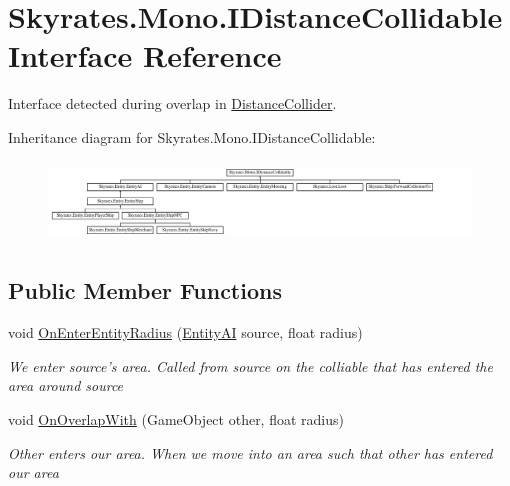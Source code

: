 \hypertarget{interface_skyrates_1_1_mono_1_1_i_distance_collidable}{\section{Skyrates.\-Mono.\-I\-Distance\-Collidable Interface Reference}
\label{interface_skyrates_1_1_mono_1_1_i_distance_collidable}
}


Interface detected during overlap in \hyperlink{class_skyrates_1_1_mono_1_1_distance_collider}{Distance\-Collider}.  


Inheritance diagram for Skyrates.\-Mono.\-I\-Distance\-Collidable\-:\begin{figure}[H]
\begin{center}
\leavevmode
\includegraphics[height=2.140673cm]{interface_skyrates_1_1_mono_1_1_i_distance_collidable}
\end{center}
\end{figure}
\subsection*{Public Member Functions}
\begin{DoxyCompactItemize}
\item 
void \hyperlink{interface_skyrates_1_1_mono_1_1_i_distance_collidable_aa7510e2d3a8388e1f28f67c5a83455c7}{On\-Enter\-Entity\-Radius} (\hyperlink{class_skyrates_1_1_entity_1_1_entity_a_i}{Entity\-A\-I} source, float radius)
\begin{DoxyCompactList}\small\item\em We enter source's area. Called from source on the colliable that has entered the area around source \end{DoxyCompactList}\item 
void \hyperlink{interface_skyrates_1_1_mono_1_1_i_distance_collidable_ab14aebc6f6831e744190428d8d712294}{On\-Overlap\-With} (Game\-Object other, float radius)
\begin{DoxyCompactList}\small\item\em Other enters our area. When we move into an area such that other has entered our area \end{DoxyCompactList}\end{DoxyCompactItemize}


